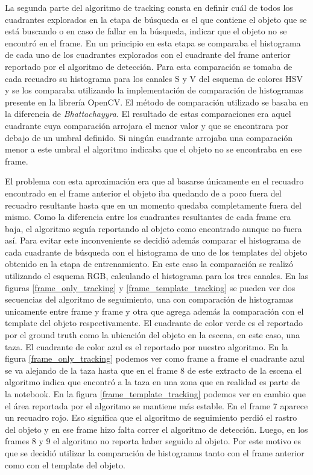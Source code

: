 La segunda parte del algoritmo de tracking consta en definir cuál de todos los cuadrantes explorados en la etapa de búsqueda es el que contiene el objeto que se está buscando o en caso de fallar en la búsqueda, indicar que el objeto no se encontró en el frame. En un principio en esta etapa se comparaba el histograma de cada uno de los cuadrantes explorados con el cuadrante del frame anterior reportado por el algoritmo de detección. Para esta comparación se tomaba de cada recuadro su histograma para los canales S y V del esquema de colores HSV y se los comparaba utilizando la implementación de comparación de histogramas presente en la librería OpenCV. El método de comparación utilizado se basaba en la diferencia de \textit{Bhattachayyra}. El resultado de estas comparaciones era aquel cuadrante cuya comparación arrojara el menor valor y que se encontrara por debajo de un umbral definido. Si ningún cuadrante arrojaba una comparación menor a este umbral el algoritmo indicaba que el objeto no se encontraba en ese frame.

El problema con esta aproximación era que al basarse únicamente en el recuadro encontrado en el frame anterior el objeto iba quedando de a poco fuera del recuadro resultante hasta que en un momento quedaba completamente fuera del mismo. Como la diferencia entre los cuadrantes resultantes de cada frame era baja, el algoritmo seguía reportando al objeto como encontrado aunque no fuera así. Para evitar este inconveniente se decidió además comparar el histograma de cada cuadrante de búsqueda con el histograma de uno de los templates del objeto obtenido en la etapa de entrenamiento. En este caso la comparación se realizó utilizando el esquema RGB, calculando el histograma para los tres canales. En las figuras \ref{frame_only_tracking} y \ref{frame_template_tracking} se pueden ver dos secuencias del algoritmo de seguimiento, una con comparación de histogramas unicamente entre frame y frame y otra que agrega además la comparación con el template del objeto respectivamente. El cuadrante de color verde es el reportado por el ground truth como la ubicación del objeto en la escena, en este caso, una taza. El cuadrante de color azul es el reportado por nuestro algoritmo. En la figura \ref{frame_only_tracking} podemos ver como frame a frame el cuadrante azul se va alejando de la taza hasta que en el frame 8 de este extracto de la escena el algoritmo indica que encontró a la taza en una zona que en realidad es parte de la notebook. En la figura \ref{frame_template_tracking} podemos ver en cambio que el área reportada por el algoritmo se mantiene más estable. En el frame 7 aparece un recuadro rojo. Eso significa que el algoritmo de seguimiento perdió el rastro del objeto y en ese frame hizo falta correr el algoritmo de detección. Luego, en los frames 8 y 9 el algoritmo no reporta haber seguido al objeto. Por este motivo es que se decidió utilizar la comparación de histogramas tanto con el frame anterior como con el template del objeto.

